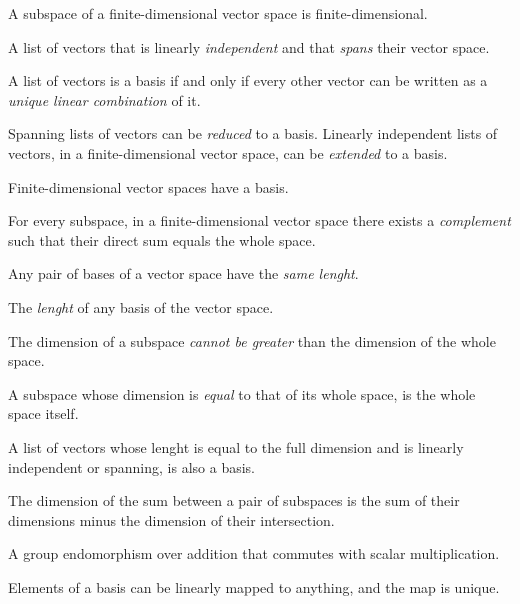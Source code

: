 \begin{multicols}{3}
  A subspace of a finite-dimensional vector space is finite-dimensional.
  
  A list of vectors that is linearly \textit{independent} and that \textit{spans} their vector space.
  
  A list of vectors is a basis if and only if every other vector can be written as a \textit{unique linear combination} of it.
  
  Spanning lists of vectors can be \textit{reduced} to a basis. Linearly independent lists of vectors, in a finite-dimensional
  vector space, can be \textit{extended} to a basis.

  Finite-dimensional vector spaces have a basis.
  
  For every subspace, in a finite-dimensional vector space there exists a \textit{complement} such that their direct sum equals the whole space.
  
  Any pair of bases of a vector space have the \textit{same lenght}.
  
  The \textit{lenght} of any basis of the vector space.
  
  The dimension of a subspace \textit{cannot be greater} than the dimension of the whole space.
  
  A subspace whose dimension is \textit{equal} to that of its whole space, is the whole space itself.
  
  A list of vectors whose lenght is equal to the full dimension and is linearly independent or spanning, is also a basis.
  
  The dimension of the sum between a pair of subspaces is the sum of their dimensions minus the dimension of their intersection.

  A group endomorphism over addition that commutes with scalar multiplication.

  Elements of a basis can be linearly mapped to anything, and the map is unique.


\end{multicols}
